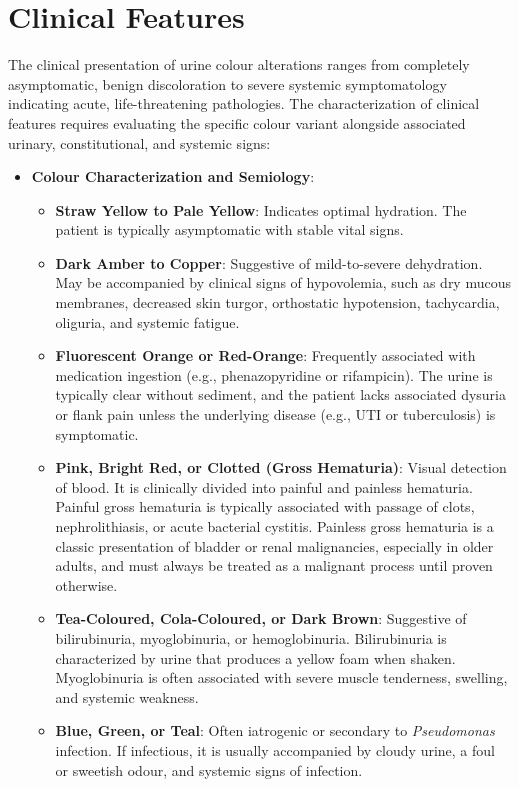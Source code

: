 \section*{Clinical Features}
The clinical presentation of urine colour alterations ranges from completely asymptomatic, benign discoloration to severe systemic symptomatology indicating acute, life-threatening pathologies. The characterization of clinical features requires evaluating the specific colour variant alongside associated urinary, constitutional, and systemic signs:

\begin{itemize}
  \item \textbf{Colour Characterization and Semiology}:
  \begin{itemize}
    \item \textbf{Straw Yellow to Pale Yellow}: Indicates optimal hydration. The patient is typically asymptomatic with stable vital signs.
    \item \textbf{Dark Amber to Copper}: Suggestive of mild-to-severe dehydration. May be accompanied by clinical signs of hypovolemia, such as dry mucous membranes, decreased skin turgor, orthostatic hypotension, tachycardia, oliguria, and systemic fatigue.
    \item \textbf{Fluorescent Orange or Red-Orange}: Frequently associated with medication ingestion (e.g., phenazopyridine or rifampicin). The urine is typically clear without sediment, and the patient lacks associated dysuria or flank pain unless the underlying disease (e.g., UTI or tuberculosis) is symptomatic.
    \item \textbf{Pink, Bright Red, or Clotted (Gross Hematuria)}: Visual detection of blood. It is clinically divided into painful and painless hematuria. Painful gross hematuria is typically associated with passage of clots, nephrolithiasis, or acute bacterial cystitis. Painless gross hematuria is a classic presentation of bladder or renal malignancies, especially in older adults, and must always be treated as a malignant process until proven otherwise.
    \item \textbf{Tea-Coloured, Cola-Coloured, or Dark Brown}: Suggestive of bilirubinuria, myoglobinuria, or hemoglobinuria. Bilirubinuria is characterized by urine that produces a yellow foam when shaken. Myoglobinuria is often associated with severe muscle tenderness, swelling, and systemic weakness.
    \item \textbf{Blue, Green, or Teal}: Often iatrogenic or secondary to \textit{Pseudomonas} infection. If infectious, it is usually accompanied by cloudy urine, a foul or sweetish odour, and systemic signs of infection.

\end{itemize}
\end{itemize}
